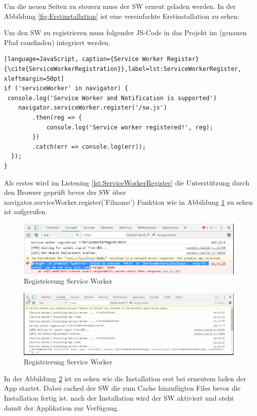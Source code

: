 Um die neuen Seiten zu steuern muss der \acs{SW} erneut geladen werden.
In der Abbildung \ref{fig:Erstinstallation} ist eine vereinfachte Erstinstallation zu sehen:


Um den \acs{SW} zu registrieren muss folgender \acs{JS}-Code in das Projekt im (genauen Pfad rausfinden) integriert werden.
\begin{lstlisting}[language=JavaScript, caption={Service Worker Register} {\cite{ServiceWorkerRegistration}},label=lst:ServiceWorkerRegister, xleftmargin=50pt]
if ('serviceWorker' in navigator) {
 console.log('Service Worker and Notification is supported')
    navigator.serviceWorker.register('/sw.js')
        .then(reg => {
            console.log('Service worker registered!', reg);
        })
        .catch(err => console.log(err));
  });
}
\end{lstlisting}

Als erstes wird im Listening \ref{lst:ServiceWorkerRegister} die Unterstützung durch den Browser geprüft bevor der \acs{SW} über navigator.serviceWorker.register('Filname') Funktion wie in Abbildung \ref{fig:RegistrierungSW} zu sehen ist aufgerufen.
\begin{figure}[h]
	\centering
	\includegraphics[width=14cm]{BilderAllgemein/SW_Registred}\medskip
	\caption{Registrierung Service Worker}
	\label{fig:RegistrierungSW}
\end{figure}

\begin{figure}[h]
	\centering
	\includegraphics[width=14cm]{BilderAllgemein/SW_Activated}\medskip
	\caption{Registrierung Service Worker}
	\label{fig:Aktivierung}
\end{figure}


In der Abbildung \ref{fig:Aktivierung} ist zu sehen wie die Installation erst bei erneutem laden der App startet. Dabei cached der \acs{SW} die zum Cache hinzufügten Files bevor die Installation fertig ist.
nach der Installation wird der \acs{SW} aktiviert und steht damit der Applikation zur Verfügung.


